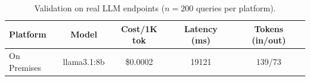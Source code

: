 \begin{table}[t]
\centering
\caption{Validation on real LLM endpoints ($n=200$ queries per platform).}
\label{tab:real_endpoints}
\begin{tabular}{lcccc}
\toprule
\textbf{Platform} & \textbf{Model} & \textbf{Cost/1K tok} & \textbf{Latency (ms)} & \textbf{Tokens (in/out)} \\
\midrule
On Premises & llama3.1:8b & \$0.0002 & 19121 & 139/73 \\
\bottomrule
\end{tabular}
\end{table}
